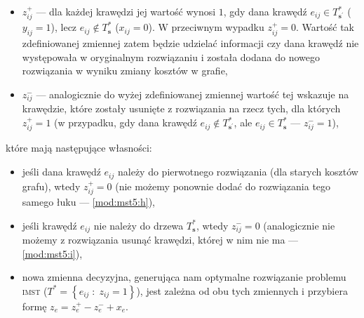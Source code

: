 \begin{itemize}
	\item $z_{ij}^{+}$ --- dla każdej krawędzi jej wartość wynosi $1$, gdy dana krawędź $e_{ij} \in T^{\ast}_{\textbf{s}^{\prime}}$ ($y_{ij} = 1$), lecz $e_{ij} \notin T^{\ast}_{\textbf{s}}$ ($x_{ij} = 0$). W przeciwnym wypadku $z_{ij}^{+} = 0$. Wartość tak zdefiniowanej zmiennej zatem będzie udzielać informacji czy dana krawędź nie występowała w oryginalnym rozwiązaniu i została dodana do nowego rozwiązania w wyniku zmiany kosztów w grafie,
	\item $z_{ij}^{-}$ --- analogicznie do wyżej zdefiniowanej zmiennej wartość tej wskazuje na krawędzie, które zostały usunięte z rozwiązania na rzecz tych, dla których $z_{ij}^{+} = 1$ (w przypadku, gdy dana krawędź $e_{ij} \notin T^{\ast}_{\textbf{s}^{\prime}}$, ale $e_{ij} \in T^{\ast}_{\textbf{s}}$ --- $z_{ij}^{-} = 1$),
\end{itemize}
które mają następujące własności:
\begin{itemize}
	\item jeśli dana krawędź $e_{ij}$ należy do pierwotnego rozwiązania (dla starych kosztów grafu), wtedy $z_{ij}^{+} = 0$ (nie możemy ponownie dodać do rozwiązania tego samego łuku --- \ref{mod:mst5:h}),
	\item jeśli krawędź $e_{ij}$ nie należy do drzewa $T^{\ast}_{\textbf{s}}$, wtedy $z_{ij}^{-} = 0$ (analogicznie nie możemy z rozwiązania usunąć krawędzi, której w nim nie ma --- \ref{mod:mst5:i}),
	\item nowa zmienna decyzyjna, generująca nam optymalne rozwiązanie problemu \textsc{imst} ($T^{\ast} = \left\{ e_{ij} \; : \; z_{ij} = 1 \right\}$), jest zależna od obu tych zmiennych i przybiera formę $z_{e} = z^{+}_{e} - z^{-}_{e} + x_{e}$.
\end{itemize}

